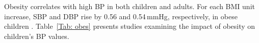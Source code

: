 \documentclass[journal,article,moreauthors]{Definitions/mdpi}
\begin{document}
Obesity correlates with high BP in both children and adults. For each BMI unit increase, SBP and DBP rise by 0.56 and 0.54\,mmHg, respectively, in obese children \citep{he2000blood}. Table~\ref{Tab: obes} presents studies examining the impact of obesity on children's BP values.



\end{document}

